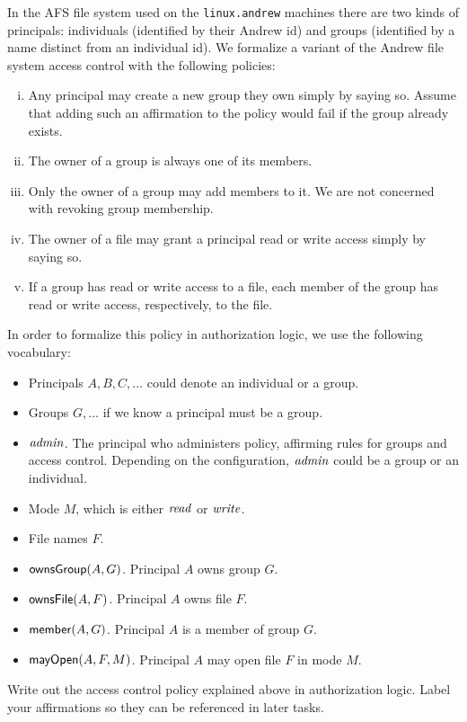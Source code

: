 \documentclass[11pt]{article}
\begin{document}
In the AFS file system used on the \verb'linux.andrew' machines there are two
kinds of principals: individuals (identified by their Andrew id) and groups
(identified by a name distinct from an individual id).  We formalize a variant
of the Andrew file system access control with the following policies:
\begin{enumerate}[(i)]
\item Any principal may create a new group they own simply by saying so.  Assume
  that adding such an affirmation to the policy would fail if the group already
  exists.
\item The owner of a group is always one of its members.
\item Only the owner of a group may add members to it.  We are not concerned
  with revoking group membership.
\item The owner of a file may grant a principal read or write access simply by
  saying so.
\item If a group has read or write access to a file, each member of the group
  has read or write access, respectively, to the file.
\end{enumerate}
In order to formalize this policy in authorization logic, we
use the following vocabulary:
\begin{itemize}
\item Principals $A, B, C, \ldots$ could denote an individual or a group.
\item Groups $G, \ldots$ if we know a principal must be a group.
\item $\mathit{admin}$. The principal who administers policy, affirming rules for
  groups and access control.  Depending on the configuration, $\mathit{admin}$ could be a
  group or an individual.
\item Mode $M$, which is either $\mathit{read}$ or $\mathit{write}$.
\item File names $F$.
\item $\mathsf{ownsGroup}(A, G)$.  Principal $A$ owns group $G$.
\item $\mathsf{ownsFile}(A, F)$.  Principal $A$ owns file $F$.
\item $\mathsf{member}(A, G)$.  Principal $A$ is a member of group $G$.
\item $\mathsf{mayOpen}(A, F, M)$.  Principal $A$ may open file $F$ in mode $M$.
\end{itemize}

\begin{task}[10 points]\rm
  Write out the access control policy explained above in authorization logic.
  Label your affirmations so they can be referenced in later tasks.
\end{task}
\end{document}
